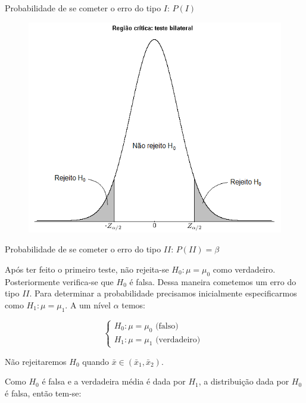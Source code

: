 \documentclass[hyperref={pdfpagelabels=false}]{beamer}
\begin{document}
\begin{frame}{Probabilidade de se cometer o erro do tipo $I$: $P(I)$}
\begin{figure}
	\centering
	\includegraphics[width=0.7\linewidth]{teste}
	\label{fig:teste}
\end{figure}
\end{frame}

\begin{frame}{Probabilidade de se cometer o erro do tipo $II$: $P(II) = \beta$}

Após ter feito o primeiro teste, não rejeita-se $H_0:\mu = \mu_0$ como verdadeiro. \pause Posteriormente verifica-se que $H_0$ é falsa. Dessa maneira cometemos um erro do tipo $II$. \pause Para determinar a probabilidade precisamos inicialmente especificarmos como $H_1:\mu = \mu_1$. \pause
A um nível $\alpha$ temos:

$$\begin{cases}
H_0: \mu = \mu_0 \text{ (falso) }\\
H_1: \mu = \mu_1 \text{ (verdadeiro) }
\end{cases}$$ \pause

Não rejeitaremos $H_0$ quando $\bar{x} \in (\bar{x}_1, \bar{x}_2)$.

Como $H_0$ é falsa e a verdadeira média é dada por $H_1$, a distribuição dada por $H_0$ é falsa, então tem-se:

\end{frame}
\end{document}
